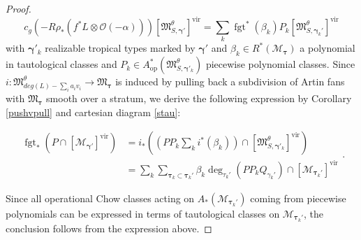 \documentclass[12pt, oneside]{amsart}   	%
\newcommand{\fgt}{\operatorname{fgt}}
\newcommand{\vir}{\operatorname{vir}}
\numberwithin{equation}{section}
\numberwithin{thm}{section}
\numberwithin{figure}{section}
\begin{document}
\begin{proof}
 
 
$$c_g(-R\rho_*(f^*L\otimes \mathcal{O}(-\alpha)))[\mathfrak{M}_{S,\pmb\gamma'}^\theta]^{\vir}= \sum_k\fgt^*(\beta_k)P_k[\mathfrak{M}^{\theta}_{S,\pmb\gamma_k'}]^{\vir}$$
with $\pmb\gamma'_k$ realizable tropical types marked by $\pmb\gamma'$ and $\beta_k\in R^*(\mathscr{M}_{\pmb\tau})$ a polynomial in tautological classes and $P_k \in A^*_{\text{op}}(\mathfrak{M}^{\theta}_{S,\pmb\gamma'_k})$ piecewise polynomial classes. Since $i: \mathfrak{M}^\theta_{deg(L)-\sum_i a_iv_i} \rightarrow \mathfrak{M}_{\pmb\tau}$ is induced by pulling back a subdivision of Artin fans with $\mathfrak{M}_{\pmb\tau}$ smooth over a stratum, we derive the following expression by Corollary \ref{pushvpull} and cartesian diagram \ref{stau}:
 


\[
\begin{split}
\fgt_*(P\cap[\mathscr{M}_{\pmb\gamma'}]^{\vir}) &= i_*((PP_k\sum_ki^*(\beta_k))\cap [\mathfrak{M}^{\theta}_{S,\pmb\gamma'_k}]^{\vir}) \\
&=  \sum_k\sum_{\pmb\tau_k \subset \pmb\tau_k'}\beta_k\deg_{\tau_k'}(PP_kQ_{\gamma_k'})\cap [\mathscr{M}_{\pmb\tau_k'}]^{\vir}
\end{split}
.\]

Since all operational Chow classes acting on $A_*(\mathscr{M}_{\pmb\tau_k'})$ coming from piecewise polynomials can be expressed in terms of tautological classes on $\mathscr{M}_{\pmb\tau_k'}$, the conclusion follows from the expression above. 
\end{proof}



\end{document}
